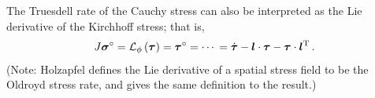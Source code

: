 \documentclass[10pt,letterpaper,oneside]{report}
\newcommand{\ten}[1]{\mbox{\boldmath $#1$}{}}
\newcommand{\scas}[1]{\mbox{{\scriptsize{${\rm{#1}}$}}}{}}
\begin{document}
The Truesdell rate of the Cauchy stress can also be interpreted as the Lie derivative of the Kirchhoff stress; that is, 
\begin{align}
J \ten{\sigma}^{\circ} = \mathcal{L}_{\phi} \left( \ten{\tau} \right) = \ten{ \tau}^{\circ} 
= \cdots{} 
= \dot{ \ten{\tau} } - \ten{l} \cdot \ten{\tau} - \ten{\tau} \cdot \ten{l}^{\scas{T}} \, . 
\end{align} 
(Note: Holzapfel defines the Lie derivative of a spatial stress field to be the Oldroyd stress rate, and gives the same definition to the result.)  
\end{document}
